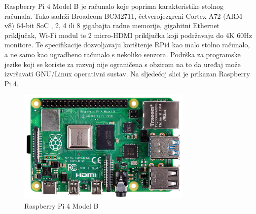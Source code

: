 \documentclass[times, utf8, diplomski]{fer}
\begin{document}
Raspberry Pi 4 Model B\citep{RPi4} je računalo koje poprima karakteristike stolnog računala. Tako sadrži Broadcom BCM2711, četverojezgreni Cortex-A72 (ARM v8) 64-bit SoC , 2, 4 ili 8 gigabajta radne memorije, gigabitni Ethernet priključak, Wi-Fi modul te 2 micro-HDMI priključka koji podržavaju do 4K 60Hz monitore. Te specifikacije dozvoljavaju korištenje RPi4 kao malo stolno računalo, a ne samo kao ugradbeno računalo s nekoliko senzora. Podrška za programske jezike koji se koriste za razvoj nije ograničena s obzirom na to da uređaj može izvršavati GNU/Linux operativni sustav. Na sljedećoj slici je prikazan Raspberry Pi 4.
\begin{figure}[htb]
    \centering
    \includegraphics[width=8.5cm]{images/rpi4.jpg}
    \caption{Raspberry Pi 4 Model B\citep{RPi4Img}}
    \label{fig:rpi4}
\end{figure}
\end{document}
